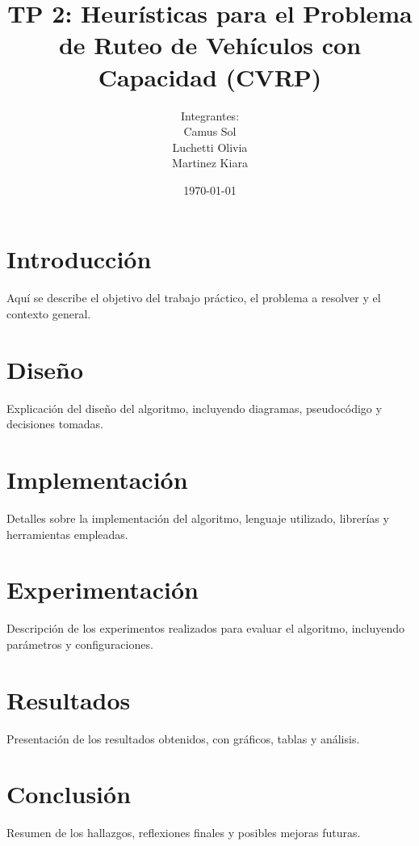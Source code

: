 \documentclass[a4paper,12pt]{article}
\title{TP 2: Heurísticas para el Problema de Ruteo de Vehículos con Capacidad (CVRP)}
\author{
    Integrantes: \\
    Camus Sol \\
    Luchetti Olivia \\
    Martinez Kiara \\
}
\date{\today}
\begin{document}
\maketitle

\tableofcontents
\newpage

\section{Introducción}
Aquí se describe el objetivo del trabajo práctico, el problema a resolver y el contexto general.

\section{Diseño}
Explicación del diseño del algoritmo, incluyendo diagramas, pseudocódigo y decisiones tomadas.

\section{Implementación}
Detalles sobre la implementación del algoritmo, lenguaje utilizado, librerías y herramientas empleadas.

\section{Experimentación}
Descripción de los experimentos realizados para evaluar el algoritmo, incluyendo parámetros y configuraciones.

\section{Resultados}
Presentación de los resultados obtenidos, con gráficos, tablas y análisis.

\section{Conclusión}
Resumen de los hallazgos, reflexiones finales y posibles mejoras futuras.
\end{document}
